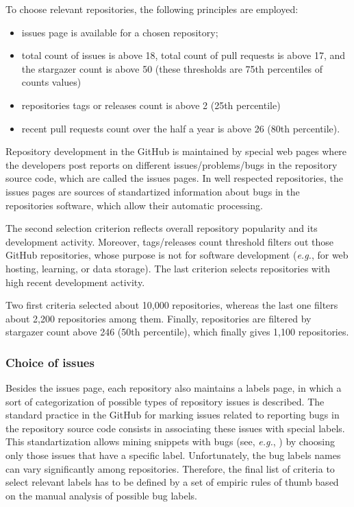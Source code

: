 \documentclass[10pt,conference]{IEEEtran}
\begin{document}
To choose relevant repositories, the following principles are employed:
\begin{itemize}
\item issues page is available for a chosen repository;
\item total count of issues is above 18, total count of pull requests is above 17, and the stargazer count is above 50 (these thresholds are 75th percentiles
of counts values)
\item repositories tags or releases count is above 2 (25th percentile) 
\item recent pull requests count over the half a year is above 26 (80th percentile).
\end{itemize}
Repository development in the GitHub is maintained by special web pages where the developers post reports on different issues/problems/bugs
in the repository source code, which are called the issues pages. In well respected repositories, the issues pages are sources of standartized information about bugs in the repositories software,
which allow their automatic processing.

The second selection criterion reflects overall repository popularity and its development activity. Moreover, tags/releases count threshold
filters out those GitHub repositories, whose purpose is not for software development (\textit{e.g.}, for web hosting, learning, or data storage).
The last criterion selects repositories with high recent development activity.

Two first criteria selected about 10,000 repositories, whereas the last one filters about 2,200 repositories among them.
Finally, repositories are filtered by stargazer count above 246 (50th percentile), which finally gives 1,100 repositories.

\subsubsection{Choice of issues}

Besides the issues page, each repository also maintains a labels page, in which a sort of categorization 
of possible types of repository issues is described. The standard practice in the GitHub for marking issues related to reporting bugs in the repository source code
consists in associating these issues with special labels. This standartization allows mining snippets with bugs (see, \textit{e.g.}, \cite{WidyasariEtAl2020,FerencEtAl2020}) by choosing 
only those issues that have a specific label.
Unfortunately, the bug labels names can vary significantly among repositories. Therefore, the final list of criteria to select relevant labels has to be defined
by a set of empiric rules of thumb based on the manual analysis of possible bug labels.
\end{document}
